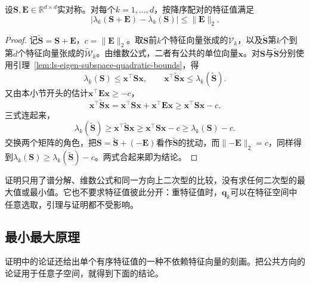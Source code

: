 \begin{theorem}[Weyl特征值扰动界]
\label{thm:ls-weyl-eigenvalue}
设$\bm S,\bm E\in\mathbb R^{d\times d}$实对称。对每个$k=1,\ldots,d$，按降序配对的特征值满足
\begin{equation}
 |\lambda_k(\bm S+\bm E)-\lambda_k(\bm S)|\leq\lVert\bm E\rVert_2 .
 \label{eq:matrix-analysis-weyl-eigenvalue-perturbation}
\end{equation}
\end{theorem}
\begin{proof}
记$\widetilde{\bm S}=\bm S+\bm E$，$c=\lVert\bm E\rVert_2$。取$\bm S$前$k$个特征向量张成的$\mathcal V_k$，以及$\widetilde{\bm S}$第$k$个到第$d$个特征向量张成的$\widetilde{\mathcal W}_k$。由维数公式，二者有公共的单位向量$\bm x$。对$\bm S$与$\widetilde{\bm S}$分别使用引理~\ref{lem:ls-eigen-subspace-quadratic-bounds}，得
\[
 \lambda_k(\bm S)\leq\bm x^\top\bm S\bm x,\qquad
 \bm x^\top\widetilde{\bm S}\bm x\leq\lambda_k(\widetilde{\bm S}).
\]
又由本小节开头的估计$\bm x^\top\bm E\bm x\geq-c$，
\[
 \bm x^\top\widetilde{\bm S}\bm x=\bm x^\top\bm S\bm x+\bm x^\top\bm E\bm x\geq\bm x^\top\bm S\bm x-c .
\]
三式连起来，
\[
 \lambda_k(\widetilde{\bm S})\geq\bm x^\top\widetilde{\bm S}\bm x\geq\bm x^\top\bm S\bm x-c\geq\lambda_k(\bm S)-c .
\]
交换两个矩阵的角色，把$\bm S=\widetilde{\bm S}+(-\bm E)$看作$\widetilde{\bm S}$的扰动，而$\lVert-\bm E\rVert_2=c$，同样得到$\lambda_k(\bm S)\geq\lambda_k(\widetilde{\bm S})-c$。两式合起来即为结论。
\end{proof}

证明只用了谱分解、维数公式和同一方向上二次型的比较，没有求任何二次型的最大值或最小值。它也不要求特征值彼此分开：重特征值时，$\bm q_k$可以在特征空间中任意选取，引理与证明都不受影响。

\subsection{最小最大原理}

证明中的论证还给出单个有序特征值的一种不依赖特征向量的刻画。把公共方向的论证用于任意子空间，就得到下面的结论。

